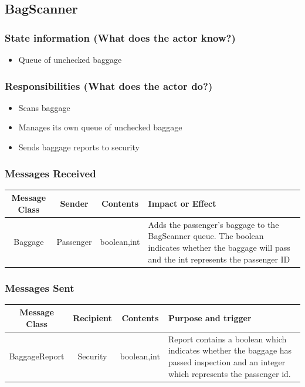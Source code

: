 \documentclass[12pt,letterpaper]{scrartcl}
\begin{document}
\subsection*{BagScanner}
\subsubsection*{State information (What does the actor know?)}
\begin{itemize}
\item Queue of unchecked baggage
\end{itemize}

\subsubsection*{Responsibilities (What does the actor do?)}
\begin{itemize}
\item Scans baggage
\item Manages its own queue of unchecked baggage
\item Sends baggage reports to security
\end{itemize}

\subsubsection*{Messages Received}
\begin{center}
\begin{tabulary}{\textwidth}{|c|c|c|L|}
	\hline
	Message Class & Sender & Contents & Impact or Effect \\ \hline
	Baggage & Passenger & boolean,int & Adds the passenger's baggage to the BagScanner queue. The boolean 
indicates whether the baggage will pass and the int represents the passenger ID \\
	\hline
\end{tabulary}
\end{center}

\subsubsection*{Messages Sent}
\begin{center}
\begin{tabulary}{\textwidth}{|c|c|c|L|}
	\hline
	Message Class & Recipient & Contents & Purpose and trigger \\
	\hline
	BaggageReport & Security & boolean,int & Report contains a boolean which indicates whether the baggage has 
passed inspection and an integer which represents the passenger id. \\
	\hline
\end{tabulary}
\end{center}
\end{document}
